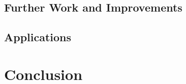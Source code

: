 \documentclass[final]{cmpreport}
\begin{document}
    \subsection{Further Work and Improvements}
    
    \subsection{Applications}

\section{Conclusion}

\clearpage



\clearpage
\appendix{} \label{apendix}
\end{document}
